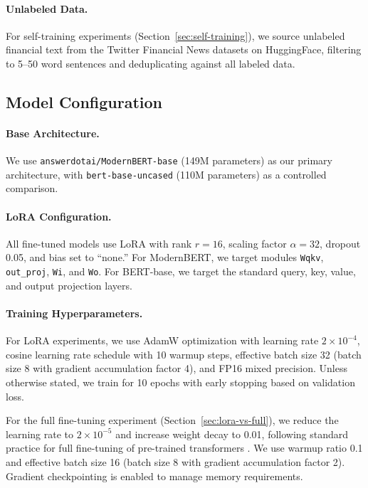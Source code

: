 \documentclass[11pt]{article}
\begin{document}
\paragraph{Unlabeled Data.}
For self-training experiments (Section~\ref{sec:self-training}), we source unlabeled financial text from the Twitter Financial News datasets on HuggingFace, filtering to 5--50 word sentences and deduplicating against all labeled data.

\subsection{Model Configuration}

\paragraph{Base Architecture.}
We use \texttt{answerdotai/ModernBERT-base} (149M parameters) as our primary architecture, with \texttt{bert-base-uncased} (110M parameters) as a controlled comparison.

\paragraph{LoRA Configuration.}
All fine-tuned models use LoRA with rank $r=16$, scaling factor $\alpha=32$, dropout 0.05, and bias set to ``none.'' For ModernBERT, we target modules \texttt{Wqkv}, \texttt{out\_proj}, \texttt{Wi}, and \texttt{Wo}. For BERT-base, we target the standard query, key, value, and output projection layers.

\paragraph{Training Hyperparameters.}
For LoRA experiments, we use AdamW optimization with learning rate $2 \times 10^{-4}$, cosine learning rate schedule with 10 warmup steps, effective batch size 32 (batch size 8 with gradient accumulation factor 4), and FP16 mixed precision. Unless otherwise stated, we train for 10 epochs with early stopping based on validation loss.

For the full fine-tuning experiment (Section~\ref{sec:lora-vs-full}), we reduce the learning rate to $2 \times 10^{-5}$ and increase weight decay to 0.01, following standard practice for full fine-tuning of pre-trained transformers \citep{devlin2019bert}. We use warmup ratio 0.1 and effective batch size 16 (batch size 8 with gradient accumulation factor 2). Gradient checkpointing is enabled to manage memory requirements.
\end{document}
